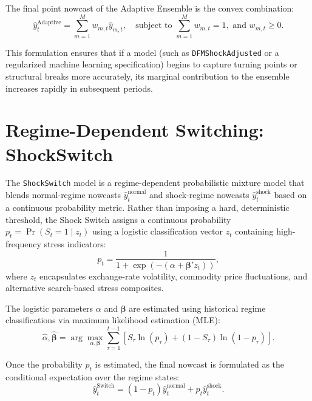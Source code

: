 \documentclass[12pt,a4paper]{article}
\begin{document}
The final point nowcast of the Adaptive Ensemble is the convex combination:
\begin{equation}
    \hat{y}_{t}^{\text{Adaptive}} = \sum_{m=1}^{M} w_{m,t} \hat{y}_{m,t}, \quad \text{subject to } \sum_{m=1}^{M} w_{m,t} = 1, \text{ and } w_{m,t} \geq 0.
\end{equation}

This formulation ensures that if a model (such as \texttt{DFMShockAdjusted} or a regularized machine learning specification) begins to capture turning points or structural breaks more accurately, its marginal contribution to the ensemble increases rapidly in subsequent periods.

\section{Regime-Dependent Switching: ShockSwitch}

The \texttt{ShockSwitch} model is a regime-dependent probabilistic mixture model that blends normal-regime nowcasts $\hat{y}_{t}^{\text{normal}}$ and shock-regime nowcasts $\hat{y}_{t}^{\text{shock}}$ based on a continuous probability metric. Rather than imposing a hard, deterministic threshold, the Shock Switch assigns a continuous probability $p_t = \Pr(S_t = 1 \mid z_t)$ using a logistic classification vector $z_t$ containing high-frequency stress indicators:
\begin{equation}
    p_t = \frac{1}{1 + \exp\left( -(\alpha + \bm{\beta}' z_t) \right)},
\end{equation}
where $z_t$ encapsulates exchange-rate volatility, commodity price fluctuations, and alternative search-based stress composites.

The logistic parameters $\alpha$ and $\bm{\beta}$ are estimated using historical regime classifications via maximum likelihood estimation (MLE):
\begin{equation}
    \hat{\alpha}, \hat{\bm{\beta}} = \arg\max_{\alpha, \bm{\beta}} \sum_{\tau=1}^{t-1} \left[ S_{\tau} \ln(p_{\tau}) + (1 - S_{\tau}) \ln(1 - p_{\tau}) \right].
\end{equation}

Once the probability $p_t$ is estimated, the final nowcast is formulated as the conditional expectation over the regime states:
\begin{equation}
    \hat{y}_{t}^{\text{Switch}} = (1 - p_t)\hat{y}_{t}^{\text{normal}} + p_t \hat{y}_{t}^{\text{shock}}.
\end{equation}
\end{document}
